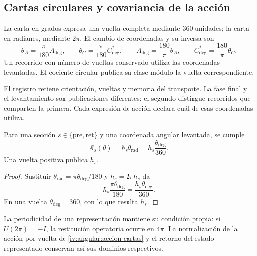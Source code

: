 \subsection{Cartas circulares y covariancia de la acción}
\label{iv:angular:cartas}

\begin{definition}
\label{iv:angular:unidades}
La carta en grados expresa una vuelta completa mediante \(360\)
unidades; la carta en radianes, mediante \(2\pi\). El cambio
de coordenadas y su inversa son
\begin{equation}
 \theta_A=\frac{\pi}{180}A_{\deg},\qquad
 \theta_C=\frac{\pi}{180}C^*_{\deg},\qquad
 A_{\deg}=\frac{180}{\pi}\theta_A,\qquad
 C^*_{\deg}=\frac{180}{\pi}\theta_C.
 \label{iv:angular:cambio-carta}
\end{equation}
Un recorrido con número de vueltas conservado utiliza las
coordenadas levantadas. El cociente circular publica su
clase módulo la vuelta correspondiente.
\end{definition}

El registro retiene orientación, vueltas y memoria del transporte.
La fase final y el levantamiento son publicaciones diferentes:
el segundo distingue recorridos que comparten la primera.
Cada expresión de acción declara cuál de esas coordenadas utiliza.

\begin{proposition}
\label{iv:angular:accion}
Para una sección \(s\in\{\mathrm{pre},\mathrm{ret}\}\) y una
coordenada angular levantada, se cumple
\begin{equation}
 \mathcal S_s(\theta)
 =\hbar_s\theta_{\mathrm{rad}}
 =h_s\frac{\theta_{\deg}}{360}.
 \label{iv:angular:accion-cartas}
\end{equation}
Una vuelta positiva publica \(h_s\).
\end{proposition}
\begin{proof}
Sustituir
\(\theta_{\mathrm{rad}}=\pi\theta_{\deg}/180\) y
\(h_s=2\pi\hbar_s\) da
\[
 \hbar_s\frac{\pi\theta_{\deg}}{180}
 =\frac{h_s\theta_{\deg}}{360}.
\]
En una vuelta \(\theta_{\deg}=360\), con lo que resulta \(h_s\).
\end{proof}

La periodicidad de una representación mantiene su condición
propia: si \(U(2\pi)=-I\), la restitución operatoria ocurre
en \(4\pi\). La normalización de la acción por vuelta de
\eqref{iv:angular:accion-cartas} y el retorno del estado
representado conservan así sus dominios respectivos.

